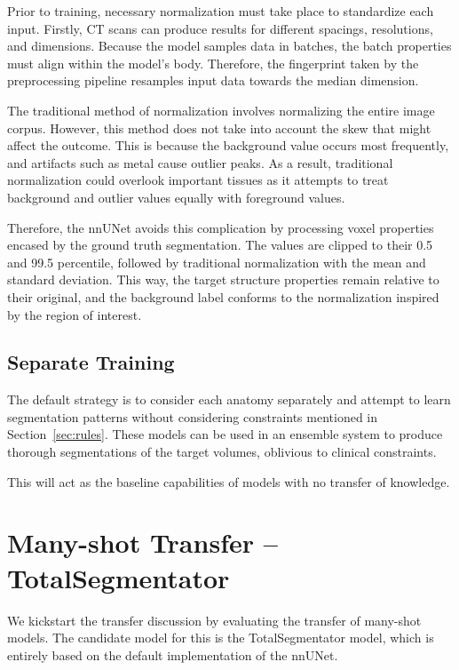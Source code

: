 \documentclass[12pt,twoside]{report}
\begin{document}
Prior to training, necessary normalization must take place to standardize each input. Firstly, CT scans can produce results for different spacings, resolutions, and dimensions. Because the model samples data in batches, the batch properties must align within the model's body. Therefore, the fingerprint taken by the preprocessing pipeline resamples input data towards the median dimension. 

The traditional method of normalization involves normalizing the entire image corpus. However, this method does not take into account the skew that might affect the outcome. This is because the background value occurs most frequently, and artifacts such as metal cause outlier peaks. As a result, traditional normalization could overlook important tissues as it attempts to treat background and outlier values equally with foreground values.

Therefore, the nnUNet avoids this complication by processing voxel properties encased by the ground truth segmentation. The values are clipped to their 0.5 and 99.5 percentile, followed by traditional normalization with the mean and standard deviation. This way, the target structure properties remain relative to their original, and the background label conforms to the normalization inspired by the region of interest.

\subsection{Separate Training}

The default strategy is to consider each anatomy separately and attempt to learn segmentation patterns without considering constraints mentioned in Section~\ref{sec:rules}. These models can be used in an ensemble system to produce thorough segmentations of the target volumes, oblivious to clinical constraints. 

This will act as the baseline capabilities of models with no transfer of knowledge.


\section{Many-shot Transfer -- TotalSegmentator}

We kickstart the transfer discussion by evaluating the transfer of many-shot models. The candidate model for this is the TotalSegmentator model, which is entirely based on the default implementation of the nnUNet. 
\end{document}
